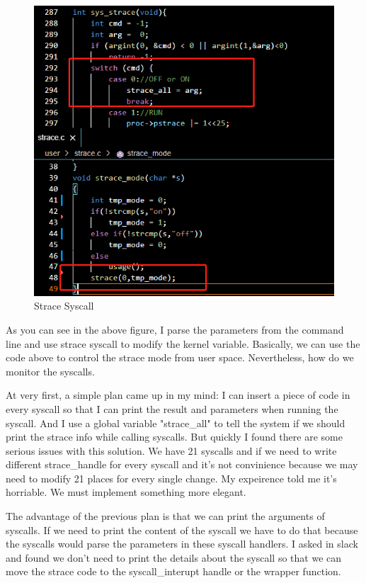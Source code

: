 \documentclass[11pt,oneside,a4paper]{article}
\begin{document}
\begin{figure}[H]
    \includegraphics[width=4.75in]{1-6.png}
    \centering
    \caption{Strace Syscall}
\end{figure}
As you can see in the above figure, I parse the parameters from the command line and 
use strace syscall to modify the kernel variable. Basically, we can use the code above
to control the strace mode from user space. Nevertheless, how do we monitor the 
syscalls.

At very first, a simple plan came up in my mind: I can insert a piece of code in every
syscall so that I can print the result and parameters when running the syscall. 
And I use a global variable "strace\_all" to tell the system if we should print the
strace info while calling syscalls. But quickly I found there are some serious 
issues with this solution. We have 21 syscalls and if we need to write different 
strace\_handle for every syscall and it's not convinience because we may need to 
modify 21 places for every single change. My expeirence told me it's horriable. 
We must implement something more elegant.

The advantage of the previous plan is that we can print the arguments of syscalls.
If we need to print the content of the syscall we have to do that because the 
syscalls would parse the parameters in these syscall handlers. I asked in slack 
and found we don't need to print the details about the syscall so that we can
move the strace code to the syscall\_interupt handle or the wrapper function.
\end{document}
